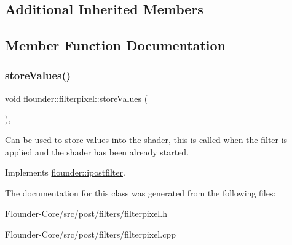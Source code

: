 \subsection*{Additional Inherited Members}


\subsection{Member Function Documentation}
\mbox{\label{classflounder_1_1filterpixel_abc7ae2b0a9bffd4986a664b690aab416}} 
\subsubsection{\texorpdfstring{store\+Values()}{storeValues()}}
{\footnotesize\ttfamily void flounder\+::filterpixel\+::store\+Values (\begin{DoxyParamCaption}{ }\end{DoxyParamCaption})\hspace{0.3cm}{\ttfamily [override]}, {\ttfamily [virtual]}}



Can be used to store values into the shader, this is called when the filter is applied and the shader has been already started. 



Implements \hyperlink{classflounder_1_1ipostfilter_a9b658b4672718d5ac36539875bde722e}{flounder\+::ipostfilter}.



The documentation for this class was generated from the following files\+:\begin{DoxyCompactItemize}
\item 
Flounder-\/\+Core/src/post/filters/filterpixel.\+h\item 
Flounder-\/\+Core/src/post/filters/filterpixel.\+cpp\end{DoxyCompactItemize}
